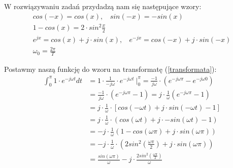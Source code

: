 \documentclass[11pt,a4paper]{article}
\numberwithin{liczba1}{liczba2}
\begin{document}
W rozwiązywaniu zadań przydadzą nam się następujące wzory:
\begin{gather*}
cos(-x) = cos(x), \ \ \ \ sin(-x) = -sin(x) \\
1 - cos(x) = 2 \cdot sin^2{\frac{x}{2}} \\
e^{jx} = cos(x) + j \cdot sin(x), \ \ \ \ e^{-jx} = cos(-x) + j \cdot sin(-x) \\
\omega_0 = \frac{2\pi}{T}
\end{gather*}

Postawmy naszą funkcję do wzoru na transformatę (\ref{transformata}): \\
\begin{equation}
\begin{split}
\int_{0}^{\pi} 1 \cdot e^{-j \omega t} dt
&{} = 1 \cdot \frac{1}{-j \omega } \cdot e^{-j \omega t} \ \Bigg|^\pi_0 = \frac{-1}{j \omega} \cdot (e^{-j \omega \pi} - e^{-j \omega 0}) \\
&{} = \frac{-1}{j \omega} \cdot (e^{-j \omega \pi} - 1) = j \cdot \frac{1}{\omega}(e^{-j \omega \pi} - 1) \\
&{} = j \cdot \frac{1}{\omega} \cdot [cos(-\omega t) + j \cdot sin(-\omega t) - 1]\\
&{} = j \cdot \frac{1}{\omega} \cdot (cos(\omega t) + j \cdot -sin(\omega t) - 1)\\
&{} = -j \cdot \frac{1}{\omega}(1 - cos(\omega \pi) + j \cdot sin(\omega \pi)) \\
&{} = -j \cdot \frac{1}{\omega} \cdot (2sin^2(\frac{\omega \pi}{2}) + j \cdot sin(\omega \pi)) \\
&{} = \frac{sin(\omega \pi)}{\omega} - j \cdot \frac{2sin^2(\frac{\omega \pi}{2})}{\omega}
\end{split}
\end{equation}
\pagebreak
\end{document}
